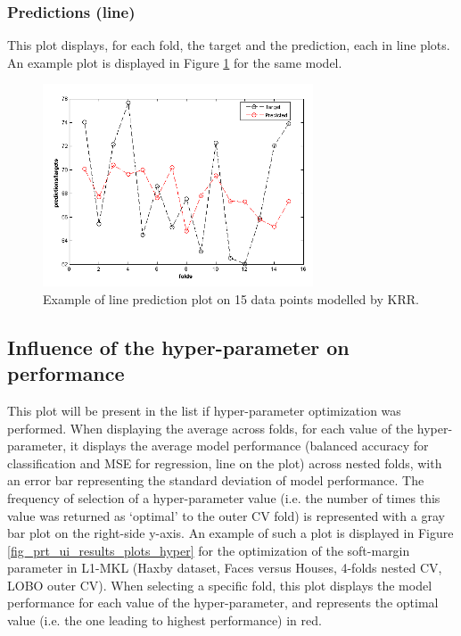 \subsubsection{Predictions (line)}

This plot displays, for each fold, the target and the prediction, each in line plots. An example plot is displayed in Figure \ref{fig_prt_ui_results_plots_line} for the same model. 

\begin{figure}[h!]
\begin{center}
\includegraphics[height=6cm]{images/prt_ui_results_plots_line.png}
\caption{Example of line prediction plot on 15 data points modelled by KRR.}
\label{fig_prt_ui_results_plots_line}
\end{center}
\end{figure}

\subsection{Influence of the hyper-parameter on performance}

This plot will be present in the list if hyper-parameter optimization was performed. When displaying the average across folds, for each value of the hyper-parameter, it displays the average model performance (balanced accuracy for classification and MSE for regression, line on the plot) across nested folds, with an error bar representing the standard deviation of model performance. The frequency of selection of a hyper-parameter value (i.e. the number of times this value was returned as `optimal' to the outer CV fold) is represented with a gray bar plot on the right-side y-axis. An example of such a plot is displayed in Figure \ref{fig_prt_ui_results_plots_hyper} for the optimization of the soft-margin parameter in L1-MKL (Haxby dataset, Faces versus Houses, 4-folds nested CV, LOBO outer CV). When selecting a specific fold, this plot displays the model performance for each value of the hyper-parameter, and represents the optimal value (i.e. the one leading to highest performance) in red. 

